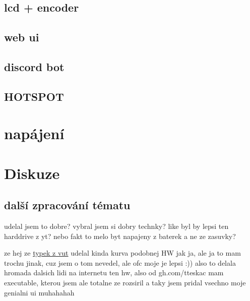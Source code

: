 \documentclass{template/socthesis}
\begin{document}
\section{lcd + encoder}
\section{web ui}
\section{discord bot}
\section{HOTSPOT}

\chapter{napájení}

\chapter{Diskuze}
\section{další zpracování tématu}
udelal jsem to dobre? vybral jsem si dobry technky?
like byl by lepsi ten harddrive z yt?
nebo fakt to melo byt napajeny z baterek a ne ze zasuvky?

ze hej ze \href{https://dspace.vutbr.cz/bitstream/handle/11012/38621/final-thesis.pdf?sequence=-1}{typek z vut} udelal kinda kurva podobnej HW jak ja, ale ja to mam trochu jinak, cuz jsem o tom nevedel, ale ofc moje je lepsi :))
also to delala hromada dalsich lidi na internetu ten hw, also od gh.com/tteskac mam executable, kterou jsem ale totalne ze rozsiril a taky jsem pridal vsechno moje genialni ui muhahahah
\end{document}
